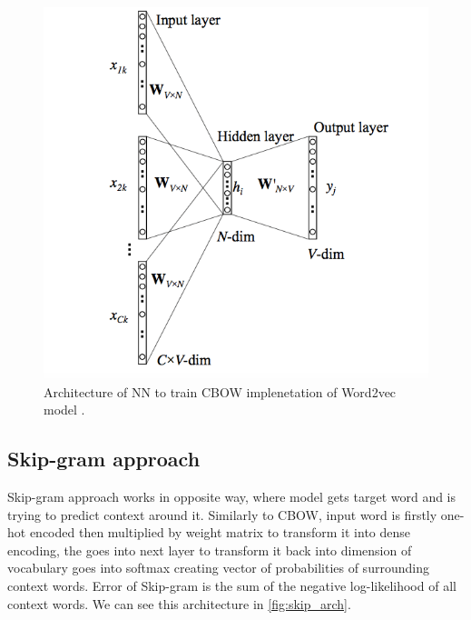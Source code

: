 \begin{figure}[!h]
	\centering
	
	\includegraphics[width=1\textwidth]{images/CBOW_arch.png}
	
	\caption{Architecture of NN to train CBOW implenetation of Word2vec model \cite{cbow}.}
	\label{fig:cbow_arch}
\end{figure}

\subsection{Skip-gram approach}

Skip-gram approach works in opposite way, where model gets target word and is trying to predict context around it. Similarly to CBOW, input word is firstly one-hot encoded then multiplied by weight matrix to transform it into dense encoding, the goes into next layer to transform it back into dimension of vocabulary goes into softmax creating vector of probabilities of surrounding context words. Error of Skip-gram is the sum of the negative log-likelihood of all context words. We can see this architecture in \ref{fig:skip_arch}.

